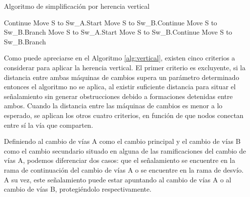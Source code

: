 	\begin{algorithm}[H]
        \caption{Algoritmo de simplificación por herencia vertical}\label{alg:vertical}
        \DontPrintSemicolon
        \SetNoFillComment
        \LinesNotNumbered 
        {
            {
                {
                    Continue\;
                }
                {
                   {
                        Move S to Sw\_A.Start\;
                   }
                   {
                        Move S to Sw\_B.Continue\;
                        Move S to Sw\_B.Branch\;
                   }
                }
                {
                   {
                        Move S to Sw\_A.Start\;
                   }
                   {
                        Move S to Sw\_B.Continue\;
                        Move S to Sw\_B.Branch\;
                   }
                }
            }
        
        }
        \KwResult{[Signals]} 
    \end{algorithm}

    Como puede apreciarse en el Algoritmo \ref{alg:vertical}, existen cinco criterios a considerar para aplicar la herencia vertical. El primer criterio es excluyente, si la distancia entre ambas máquinas de cambios supera un parámetro determinado entonces el algoritmo no se aplica, al existir suficiente distancia para situar el señalamiento sin generar obstrucciones debido a formaciones detenidas entre ambos. Cuando la distancia entre las máquinas de cambios es menor a lo esperado, se aplican los otros cuatro criterios, en función de que nodos conectan entre sí la vía que comparten.
    
    Definiendo al cambio de vías A como el cambio principal y el cambio de vías B como el cambio secundario situado en alguna de las ramificaciones del cambio de vías A, podemos diferenciar dos casos: que el señalamiento se encuentre en la rama de continuación del cambio de vías A o se encuentre en la rama de desvío. A su vez, este señalamiento puede estar apuntando al cambio de vías A o al cambio de vías B, protegiéndolo respectivamente. 
    
